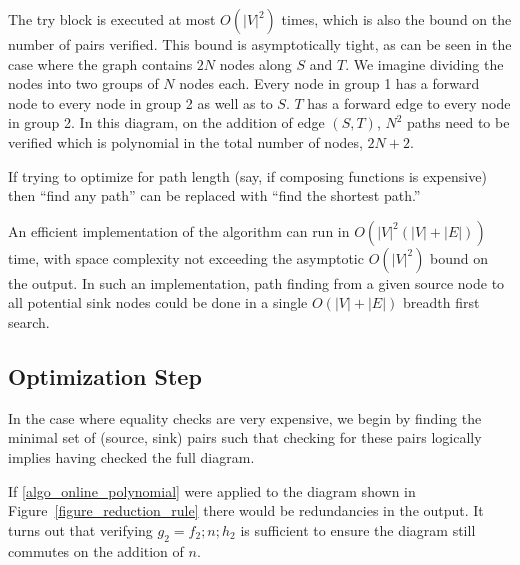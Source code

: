 \documentclass[sigplan,review]{acmart}
\begin{document}
{The try block is executed at most $O(|V|^2)$ times, which is also the bound on the number of pairs verified.
%
This bound is asymptotically tight, as can be seen in the case where the graph contains $2N$ nodes along $S$ and $T$.
We imagine dividing the nodes into two groups of $N$ nodes each. Every node in group 1 has a forward node to every node in group 2 as well as to $S$. $T$ has a forward edge to every node in group 2. In this diagram, on the addition of edge $(S, T)$, $N^2$ paths need to be verified which is polynomial in the total number of nodes, $2N+2$.

If trying to optimize for path length (say, if composing functions is expensive) then ``find any path'' can be replaced with ``find the shortest path.''

An efficient implementation of the algorithm can run in $O(|V|^2(|V|+|E|))$ time, with space complexity not exceeding the asymptotic $O(|V|^2)$ bound on the output.
In such an implementation, path finding from a given source node to all potential sink nodes could be done in a single $O(|V|+|E|)$ breadth first search.

\subsection{Optimization Step}

In the case where equality checks are very expensive, we begin by finding the minimal set of (source, sink) pairs such that checking for these pairs logically implies having checked the full diagram.

If \ref{algo_online_polynomial} were applied to the diagram shown in Figure~\ref{figure_reduction_rule} there would be redundancies in the output.
It turns out that verifying $g_2=f_2 ; n ; h_2$ is sufficient to ensure the diagram still commutes on the addition of $n$.

}
\end{document}
